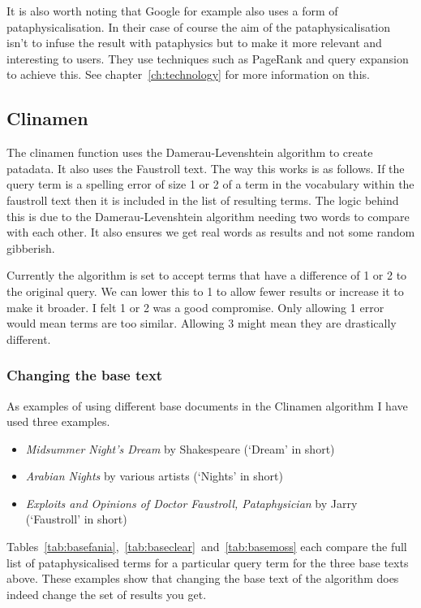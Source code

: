 It is also worth noting that Google for example also uses a form of pataphysicalisation. In their case of course the aim of the pataphysicalisation isn't to infuse the result with pataphysics but to make it more relevant and interesting to users. They use techniques such as PageRank and query expansion to achieve this. See chapter~\ref{ch:technology} for more information on this.


\subsection{Clinamen}

The clinamen function uses the Damerau-Levenshtein algorithm to create patadata. It also uses the Faustroll text. The way this works is as follows. If the query term is a spelling error of size 1 or 2 of a term in the vocabulary within the faustroll text then it is included in the list of resulting terms. The logic behind this is due to the Damerau-Levenshtein algorithm needing two words to compare with each other. It also ensures we get real words as results and not some random gibberish.

Currently the algorithm is set to accept terms that have a difference of 1 or 2 to the original query. We can lower this to 1 to allow fewer results or increase it to make it broader. I felt 1 or 2 was a good compromise. Only allowing 1 error would mean terms are too similar. Allowing 3 might mean they are drastically different.


\subsubsection{Changing the base text}
\label{s:basetext}

As examples of using different base documents in the Clinamen algorithm I have used three examples. 

\begin{itemize}
  \item \textit{Midsummer Night's Dream} by Shakespeare (`Dream' in short)
  \item \textit{Arabian Nights} by various artists (`Nights' in short)
  \item \textit{Exploits and Opinions of Doctor Faustroll, Pataphysician} by Jarry (`Faustroll' in short)
\end{itemize}

Tables~\ref{tab:basefania},~\ref{tab:baseclear}~and~\ref{tab:basemoss} each compare the full list of pataphysicalised terms for a particular query term for the three base texts above. These examples show that changing the base text of the algorithm does indeed change the set of results you get. 

